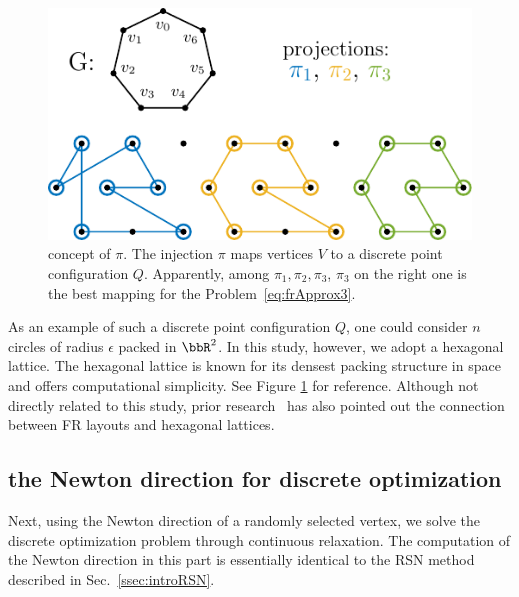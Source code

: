 \documentclass[dvipdfmx,journal]{IEEEtran}
\begin{document}
\begin{figure}[t]
  \centering
  \includegraphics[width=\columnwidth]{pi/pi.pdf}
  \caption{
    concept of $\pi$.
    The injection $\pi$ maps vertices $V$ to a discrete point configuration $Q$.
    Apparently, among $\pi_1, \pi_2, \pi_3$, $\pi_3$ on the right one is the best mapping for the Problem~\eqref{eq:frApprox3}.
  }
  \label{fig:pi}
\end{figure}

As an example of such a discrete point configuration $Q$, one could consider $n$ circles of radius $\epsilon$ packed in $\bbR^2$.
In this study, however, we adopt a hexagonal lattice.
The hexagonal lattice is known for its densest packing structure in space and offers computational simplicity.
See Figure \ref{fig:pi} for reference.
Although not directly related to this study, prior research~\cite{s22145179} has also pointed out the connection between FR layouts and hexagonal lattices.

\subsection{the Newton direction for discrete optimization}\label{ssec:newtonDirection}

Next, using the Newton direction of a randomly selected vertex, we solve the discrete optimization problem through continuous relaxation. The computation of the Newton direction in this part is essentially identical to the RSN method described in Sec.~\ref{ssec:introRSN}.
\end{document}
